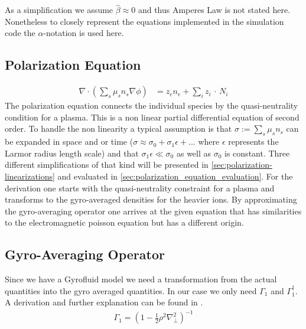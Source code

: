 \documentclass[master.tex]{subfiles}
\begin{document}
As a simplification we assume $\hat{\beta} \approx 0$ and thus Amperes Law is not stated here. Nonetheless to closely represent the equations implemented in the simulation code the $\alpha$-notation is used here.

\subsection{Polarization Equation}

\begin{align}
    \nabla \cdot \left( \sum_s \mu_s n_s \nabla \phi  \right) &= z_e n_e + \sum_i z_i \, \cdot \, N_i \label{eq:polarization}
\end{align}
The polarization equation connects the individual species by the quasi-neutrality condition for a plasma. This is a non linear partial differential equation of second order. To handle the non linearity a typical assumption is that $\sigma := \sum_s \mu_s n_s$ can be expanded in space and or time ($\sigma \approx \sigma_0 + \sigma_1 \epsilon + ...$ where $\epsilon$ represents the Larmor radius length scale) and that $\sigma_1 \epsilon \ll \sigma_0$ as well as $\sigma_0$ is constant. Three different simplifications of that kind will be presented in \autoref{sec:polarization-linearizations} and evaluated in \autoref{sec:polarization_equation_evaluation}. For the derivation one starts with the quasi-neutrality constraint for a plasma and transforms to the gyro-averaged densities for the heavier ions. By approximating the gyro-averaging operator one arrives at the given equation that has similarities to the electromagnetic poisson equation but has a different origin.

\subsection{Gyro-Averaging Operator}
Since we have a Gyrofluid model we need a transformation from the actual quantities into the gyro averaged quantities. In our case we only need $\Gamma_1$ and $\Gamma_1^\dagger$. A derivation and further explanation can be found in \cite{HeldDisseration}.
\begin{align}
    \label{eq:gyro-averaging-opeartor}
    \Gamma_1 = \left(1- \frac{1}{2} \rho^2 \nabla_\perp^2\right)^{-1}
\end{align}
\end{document}

